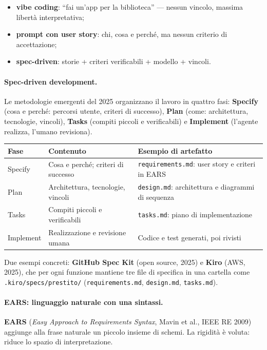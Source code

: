 \documentclass[12pt]{extarticle}
\begin{document}
\begin{itemize}
    \item \textbf{vibe coding}: ``fai un'app per la biblioteca'' --- nessun vincolo, massima libertà interpretativa;
    \item \textbf{prompt con user story}: chi, cosa e perché, ma nessun criterio di accettazione;
    \item \textbf{spec-driven}: storie + criteri verificabili + modello + vincoli.
\end{itemize}

\paragraph{Spec-driven development.}
Le metodologie emergenti del 2025 organizzano il lavoro in quattro fasi: \textbf{Specify} (cosa e perché: percorsi utente, criteri di successo), \textbf{Plan} (come: architettura, tecnologie, vincoli), \textbf{Tasks} (compiti piccoli e verificabili) e \textbf{Implement} (l'agente realizza, l'umano revisiona).

\begin{center}
\small
\begin{tabular}{p{2.2cm}p{6.4cm}p{6.6cm}}
    \toprule
    \textbf{Fase} & \textbf{Contenuto} & \textbf{Esempio di artefatto} \\
    \midrule
    Specify & Cosa e perché; criteri di successo & \texttt{requirements.md}: user story e criteri in EARS \\
    Plan & Architettura, tecnologie, vincoli & \texttt{design.md}: architettura e diagrammi di sequenza \\
    Tasks & Compiti piccoli e verificabili & \texttt{tasks.md}: piano di implementazione \\
    Implement & Realizzazione e revisione umana & Codice e test generati, poi rivisti \\
    \bottomrule
\end{tabular}
\end{center}

\noindent Due esempi concreti: \textbf{GitHub Spec Kit} (open source, 2025) e \textbf{Kiro} (AWS, 2025), che per ogni funzione mantiene tre file di specifica in una cartella come \texttt{.kiro/specs/prestito/} (\texttt{requirements.md}, \texttt{design.md}, \texttt{tasks.md}).

\paragraph{EARS: linguaggio naturale con una sintassi.}
\textbf{EARS} (\textit{Easy Approach to Requirements Syntax}, Mavin et al., IEEE RE 2009) aggiunge alla frase naturale un piccolo insieme di schemi. La rigidità è voluta: riduce lo spazio di interpretazione.
\end{document}
